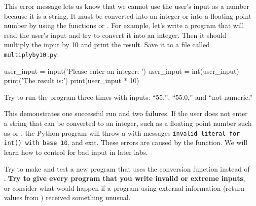 \documentclass[11pt]{cselabheader}
\begin{document}
This error message lets us know that we cannot use the user's input as
a number because it is a string.  It must be converted into an integer
or into a floating point number by using the functions
 or .  For example, let's
write a program that will read the user's input and try to convert it
into an integer. Then it should multiply the input by 10 and print the
result.  Save it to a file called \texttt{multiplyby10.py}:

\begin{python3code}
user_input = input('Please enter an integer: ')
user_input = int(user_input)
print('The result is:')
print(user_input * 10)
\end{python3code}

Try to run the program three times with inputs:
``55,'', ``55.0,'' and ``not numeric.''


This demonstrates one successful run and two failures.  If the user
does not enter a string that can be converted to an integer, such as a
floating point number such as  or
, the Python program will throw a
 with messages \texttt{invalid literal for
int() with base 10}, and exit. These errors are caused by the
 function.  We will learn how to control for bad
input in later labs.

Try to make and test a new program that uses the conversion function
 instead of .
\textbf{Try to give every program that you write invalid or
extreme inputs}, or consider what would happen if a program
using external information (return values from )
received something unusual.
\end{document}
